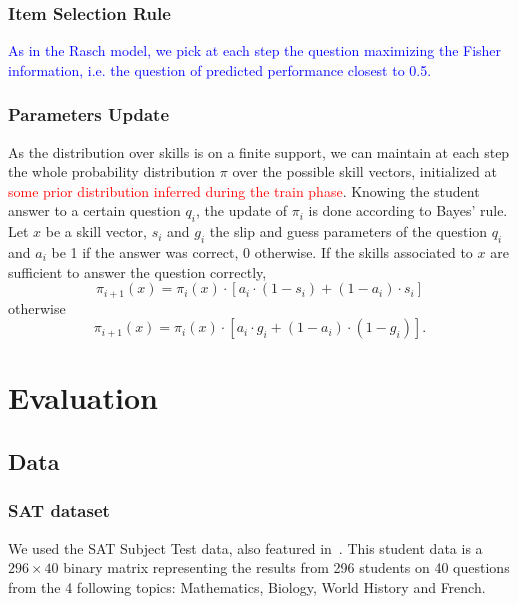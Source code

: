 \documentclass{sig-alternate}
\newcommand\alert[1]{\textcolor{red}{#1}}
\newcommand\note[1]{\textcolor{blue}{#1}}
\begin{document}
\subsubsection{Item Selection Rule}

\note{As in the Rasch model, we pick at each step the question maximizing the Fisher information, i.e. the question of predicted performance closest to 0.5.}

\subsubsection{Parameters Update}

As the distribution over skills is on a finite support, we can maintain at each step the whole probability distribution $\pi$ over the possible skill vectors, initialized at \alert{some prior distribution inferred during the train phase}.
Knowing the student answer to a certain question $q_i$, the update of $\pi_i$ is done according to Bayes' rule. Let $x$ be a skill vector, $s_i$ and $g_i$ the slip and guess parameters of the question $q_i$ and $a_i$ be 1 if the answer was correct, 0 otherwise. If the skills associated to $x$ are sufficient to answer the question correctly,
\[ \pi_{i+1}(x) = \pi_i(x) \cdot [a_i \cdot(1-s_i) + (1-a_i)\cdot s_i] \]
otherwise
\[ \pi_{i+1}(x) = \pi_i(x) \cdot [a_i \cdot g_i + (1-a_i)\cdot(1-g_i)]. \]

\section{Evaluation}

\subsection{Data} %

\subsubsection{SAT dataset}

We used the SAT Subject Test data, also featured in~\cite{Winters2005, Desmarais2011}. This student data is a $296 \times 40$ binary matrix representing the results from 296 students on 40 questions from the 4 following topics: Mathematics, Biology, World History and French.
\end{document}
